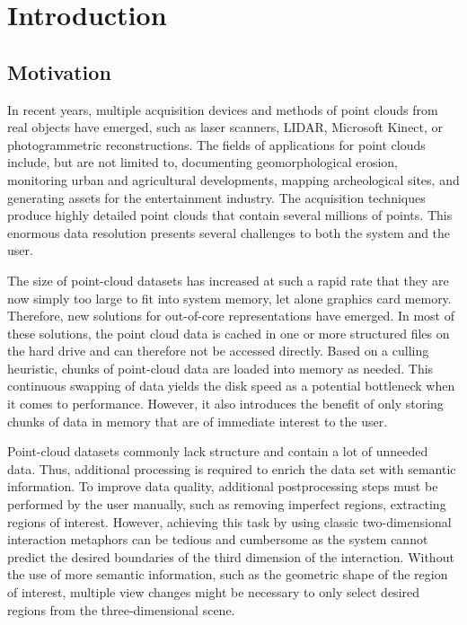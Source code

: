 \chapter{Introduction}

\section{Motivation}

In recent years, multiple acquisition devices and methods of point clouds from real objects have emerged, such as laser scanners, LIDAR, Microsoft Kinect, or photogrammetric reconstructions. The fields of applications for point clouds include, but are not limited to, documenting geomorphological erosion, monitoring urban and agricultural developments, mapping archeological sites, and generating assets for the entertainment industry. The acquisition techniques produce highly detailed point clouds that contain several millions of points. This enormous data resolution presents several challenges to both the system and the user. 

\par

The size of point-cloud datasets has increased at such a rapid rate that they are now simply too large to fit into system memory, let alone graphics card memory. Therefore, new solutions for out-of-core representations have emerged. In most of these solutions, the point cloud data is cached in one or more structured files on the hard drive and can therefore not be accessed directly. Based on a culling heuristic, chunks of point-cloud data are loaded into memory as needed. This continuous swapping of data yields the disk speed as a potential bottleneck when it comes to performance. However, it also introduces the benefit of only storing chunks of data in memory that are of immediate interest to the user. 

\par

Point-cloud datasets commonly lack structure and contain a lot of unneeded data. Thus, additional processing is required to enrich the data set with semantic information. To improve data quality, additional postprocessing steps must be performed by the user manually, such as removing imperfect regions, extracting regions of interest. However, achieving this task by using classic two-dimensional interaction metaphors can be tedious and cumbersome as the system cannot predict the desired boundaries of the third dimension of the interaction. Without the use of more semantic information, such as the geometric shape of the region of interest, multiple view changes might be necessary to only select desired regions from the three-dimensional scene. 

